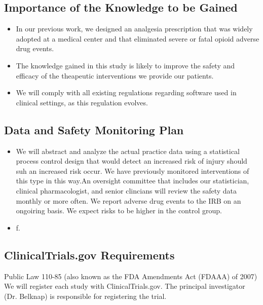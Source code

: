 \documentclass{article}
\begin{document}
\subsection{Importance of the Knowledge to be Gained}
\begin{itemize}
\item In our previous work, we designed an analgesia prescription that was widely adopted at a medical center and that eliminated severe or fatal opioid adverse drug events. 
\item The knowledge gained in this study is likely to improve the safety and efficacy of the theapeutic interventions we provide our patients.
\item We will comply with all existing regulations regarding software used in clinical settings, as this regulation evolves.
\end{itemize} 
\subsection{Data and Safety Monitoring Plan}
\begin{itemize}
\item We will abstract and analyze the actual practice data using a statistical process control design that would detect an increased risk of injury should suh an increased risk occur. We have previously monitored interventions of this type in this way.An oversight committee that includes our statistician, clinical pharmacologist, and senior clincians will review the safety data monthly or more often. We report adverse drug events to the IRB on an ongoiring basis. 
We expect risks to be higher in the control group.  
\item f.	 
\end{itemize}
\subsection{ClinicalTrials.gov Requirements}
Public Law 110-85 (also known as the FDA Amendments Act (FDAAA) of 2007) We will register each study with ClinicalTrials.gov. The principal investigator (Dr. Belknap) is responsible for registering the trial.
\end{document}
